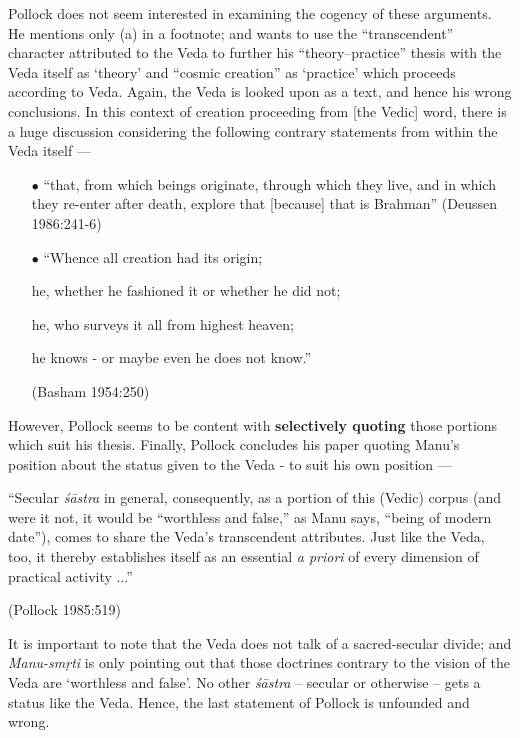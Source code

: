 Pollock does not seem interested in examining the cogency of these arguments. He mentions only (a) in a footnote; and wants to use the ``transcendent'' character attributed to the Veda to further his ``theory–practice'' thesis with the Veda itself as `theory' and ``cosmic creation'' as `practice' which proceeds according to Veda. Again, the Veda is looked upon as a text, and hence his wrong conclusions. In this context of creation proceeding from [the Vedic] word, there is a huge discussion considering the following contrary statements from within the Veda itself ---
\begin{itemize}
\itemsep=1pt
\item[$\bullet$] ``that, from which beings originate, through which they live, and in which they re-enter after death, explore that [because] that is Brahman'' (Deussen 1986:241-6)

\item[$\bullet$] ``Whence all creation had its origin; 

he, whether he fashioned it or whether he did not;

\newpage

he, who surveys it all from highest heaven; 

he knows - or maybe even he does not know.'' 

\hfill (Basham 1954:250)
\end{itemize}
However, Pollock seems to be content with {\bf selectively quoting} those portions which suit his thesis. Finally, Pollock concludes his paper quoting Manu's position about the status given to the Veda - to suit his own position ---
\begin{myquote}
``Secular {\sl śāstra} in general, consequently, as a portion of this (Vedic) corpus (and were it not, it would be ``worthless and false,'' as Manu says, ``being of modern date''), comes to share the Veda's transcendent attributes. Just like the Veda, too, it thereby establishes itself as an essential {\sl a priori} of every dimension of practical activity ...'' 

\hfill (Pollock 1985:519)
\end{myquote}

It is important to note that the Veda does not talk of a sacred-secular divide; and {\sl Manu-smṛti} is only pointing out that those doctrines contrary to the vision of the Veda are `worthless and false'. No other {\sl śāstra} -- secular or otherwise -- gets a status like the Veda. Hence, the last statement of Pollock is unfounded and wrong.

